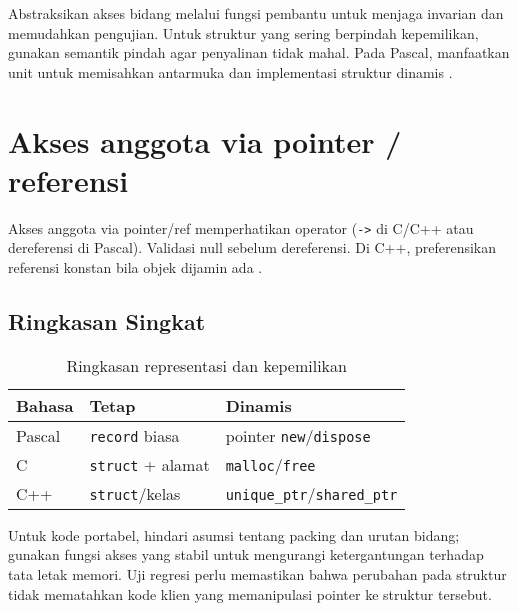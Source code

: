 \documentclass[../main.tex]{subfiles}
\begin{document}
Abstraksikan akses bidang melalui fungsi pembantu untuk menjaga invarian dan memudahkan pengujian. Untuk struktur yang sering berpindah kepemilikan, gunakan semantik pindah agar penyalinan tidak mahal. Pada Pascal, manfaatkan unit untuk memisahkan antarmuka dan implementasi struktur dinamis \parencite{free-pascal-docs}.

\section{Akses anggota via pointer / referensi}
Akses anggota via pointer/ref memperhatikan operator (\texttt{->} di C/C++ atau dereferensi di Pascal). Validasi null sebelum dereferensi. Di C++, preferensikan referensi konstan bila objek dijamin ada \parencite{gnu-c-manual,cpp-reference}.

\subsection{Ringkasan Singkat}
\begin{table}[h]
  \centering
  \caption{Ringkasan representasi dan kepemilikan}
  \begin{tabular}{@{}lll@{}}
    \toprule
    Bahasa & Tetap & Dinamis \\
    \midrule
    Pascal & \texttt{record} biasa & pointer \texttt{new}/\texttt{dispose} \\
    C & \texttt{struct} + alamat & \texttt{malloc}/\texttt{free} \\
    C++ & \texttt{struct}/kelas & \texttt{unique\_ptr}/\texttt{shared\_ptr} \\
    \bottomrule
  \end{tabular}
\end{table}

Untuk kode portabel, hindari asumsi tentang packing dan urutan bidang; gunakan fungsi akses yang stabil untuk mengurangi ketergantungan terhadap tata letak memori. Uji regresi perlu memastikan bahwa perubahan pada struktur tidak mematahkan kode klien yang memanipulasi pointer ke struktur tersebut.
\end{document}
